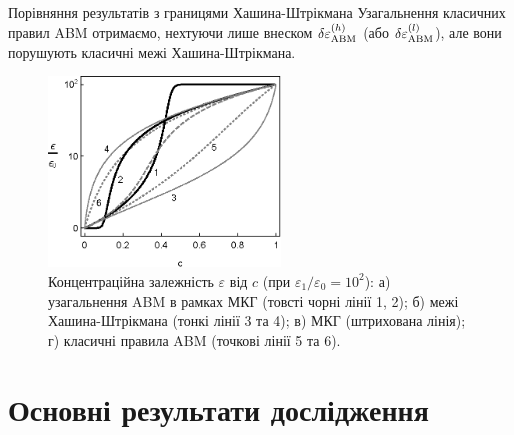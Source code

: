 \documentclass[10pt]{beamer}
\begin{document}
\begin{frame}{Порівняння результатів з границями Хашина-Штрікмана}
\footnotesize
Узагальнення класичних правил ABM отримаємо, нехтуючи лише внеском $\delta\varepsilon_{\rm ABM}^{(h)}$ (або $\delta\varepsilon_{\rm ABM}^{(l)}$), але вони порушують класичні межі Хашина-Штрікмана. 
\begin{figure}[tb]
    \centering
    \includegraphics[width=0.55\textwidth]{images/hanai-fig2.eps}
    \caption{\label{fig:HSbounds}
    Концентраційна залежність $\varepsilon$ від $c$ (при $\varepsilon_1/\varepsilon_0 = 10^2$): а) узагальнення ABM в рамках МКГ (товсті чорні лінії 1, 2); б) межі Хашина-Штрікмана (тонкі лінії 3 та 4); в) МКГ (штрихована лінія); г) класичні правила ABM (точкові лінії 5 та 6).}
\end{figure}

\end{frame}


\section{Основні результати дослідження}%
\end{document}
